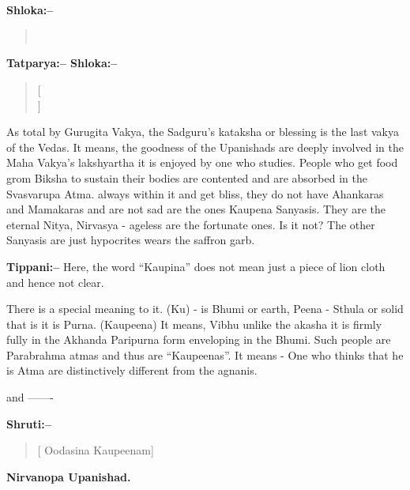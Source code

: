 \chapter[Shri Ganeshaya namaha: kaupina (yati) panchakam]{}

\textbf{Shloka:–}

\begin{verse}
 \\ 
\end{verse}

\textbf{Tatparya:– Shloka:–}

\begin{verse}
 [\\]
\end{verse}

As total by Gurugita Vakya, the Sadguru's kataksha or blessing is the last vakya of the Vedas. It means, the goodness of the Upanishads are deeply involved in the Maha Vakya's lakshyartha it is enjoyed by one who studies. People who get food grom Biksha to sustain their bodies are contented and are absorbed in the Svasvarupa Atma. always within it and get bliss, they do not have Ahankaras and Mamakaras and are not sad are the ones Kaupena Sanyasis. They are the eternal Nitya, Nirvasya - ageless are the fortunate ones. Is it not? The other Sanyasis are just hypocrites wears the saffron garb.

\textbf{Tippani:–} Here, the word “Kaupina” does not mean just a piece of lion cloth and hence not clear.

There is a special meaning to it. (Ku) - is Bhumi or earth, Peena - Sthula or solid that is it is Purna. (Kaupeena) It means, Vibhu unlike the akasha it is firmly fully in the Akhanda Paripurna form enveloping in the Bhumi. Such people are Parabrahma atmas and thus are “Kaupeenas”. It means - One who thinks that he is Atma are distinctively different from the agnanis.

and -------

\textbf{Shruti:–}

\begin{verse}
[ Oodasina Kaupeenam]
\end{verse}

\begin{flushright}
\textbf{Nirvanopa Upanishad.}
\end{flushright}

